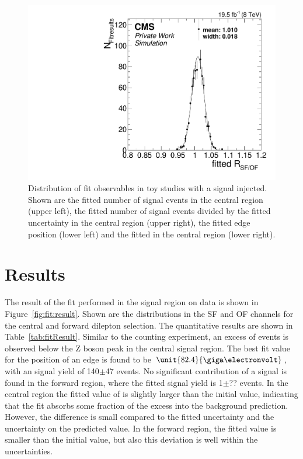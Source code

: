 \begin{figure}[hbp]
\begin{minipage}[t]{0.49\textwidth}
  \end{minipage}
  \begin{minipage}[t]{0.49\textwidth}
    \includegraphics[width=\textwidth]{plots/results/fit/rSFOF_signalInjected.pdf}
  \end{minipage}
  \caption{Distribution of fit observables in toy studies with a signal injected. Shown are the fitted number of signal events in the central region (upper left), the fitted number of signal events divided by the fitted uncertainty in the central region (upper right), the fitted edge position (lower left) and the fitted \Rsfof in the central region (lower right).}
  \label{fig:toys:signalInjected}
\end{figure}
\newpage

\section{Results}
The result of the fit performed in the signal region on data is shown in Figure~\ref{fig:fit:result}. Shown are the \mll distributions in the SF and OF channels for the central and forward dilepton selection. The quantitative results are shown in Table~\ref{tab:fitResult}. Similar to the counting experiment, an excess of events is observed below the Z boson peak in the central signal region. The best fit value for the position of an edge is found to be $\unit{82.4}{\giga\electronvolt}$, with an signal yield of 140$\pm$47 events. No significant contribution of a signal is found in the forward region, where the fitted signal yield is 1$\pm$?? events. In the central region the fitted value of \Rsfof is slightly larger than the initial value, indicating that the fit absorbs some fraction of the excess into the background prediction. However, the difference is small compared to the fitted uncertainty and the uncertainty on the predicted value. In the forward region, the fitted value is smaller than the initial value, but also this deviation is well within the uncertainties. 


